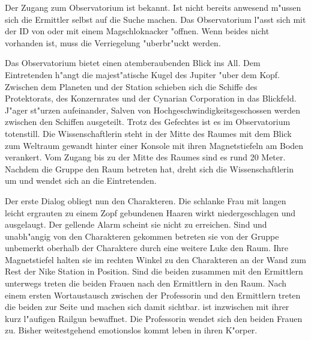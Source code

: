 
Der Zugang zum Observatorium ist \ml{} bekannt. Ist \ml{} nicht bereits anwesend m"ussen sich die Ermittler selbst auf die Suche machen. Das Observatorium l"asst sich mit der ID von \ml{} oder mit einem Magschlo\3knacker "offnen. Wenn beides nicht vorhanden ist, muss die Verriegelung "uberbr"uckt werden.

Das Observatorium bietet einen atemberaubenden Blick ins All. Dem Eintretenden h"angt die majest"atische Kugel des Jupiter "uber dem Kopf. Zwischen dem Planeten und der Station schieben sich die Schiffe des Protektorats, des Konzernrates und der Cynarian Corporation in das Blickfeld. J"ager st"urzen aufeinander, Salven von Hochgeschwindigkeitsgeschossen werden zwischen den Schiffen ausgeteilt. Trotz des Gefechtes ist es im Observatorium totenstill. Die Wissenschaftlerin steht in der Mitte des Raumes mit dem Blick zum Weltraum gewandt hinter einer Konsole mit ihren Magnetstiefeln am Boden verankert. Vom Zugang bis zu der Mitte des Raumes sind es rund 20 Meter. Nachdem die Gruppe den Raum betreten hat, dreht sich die Wissenschaftlerin um und wendet sich an die Eintretenden.


Der erste Dialog obliegt nun den Charakteren. Die schlanke Frau mit langen leicht ergrauten zu einem Zopf gebundenen Haaren wirkt niedergeschlagen und ausgelaugt. Der gellende Alarm scheint sie nicht zu erreichen. Sind \xl{} und \ml{} unabh"angig von den Charakteren gekommen betreten sie von der Gruppe unbemerkt oberhalb der Charaktere durch eine weitere Luke den Raum. Ihre Magnetstiefel halten sie im rechten Winkel zu den Charakteren an der Wand zum Rest der Nike Station in Position. Sind die beiden zusammen mit den Ermittlern unterwegs treten die beiden Frauen nach den Ermittlern in den Raum. Nach einem ersten Wortaustausch zwischen der Professorin und den Ermittlern treten die beiden zur Seite und machen sich damit sichtbar. \xl{} ist inzwischen mit ihrer kurz l"aufigen Railgun bewaffnet. Die Professorin wendet sich den beiden Frauen zu. Bisher weitestgehend emotionslos kommt leben in ihren K"orper.


